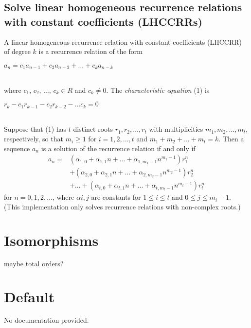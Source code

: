 \documentclass{article}
\begin{document}
\subsection{Solve linear homogeneous recurrence relations with constant coefficients (LHCCRRs)}
A linear homogeneous recurrence relation with constant coefficients (LHCCRR) of degree $k$ is a recurrence relation of the form\\
\centerline{$a_n = c_1a_{n-1} +c_2a_{n-2} + \dots +c_ka_{n-k}$}\\
where $c_1$, $c_2$, $\dots$, $c_k \in R$ and $c_k \neq 0$. The \emph{characteristic equation} (1) is\\
\centerline{$r_k - c_1r_{k-1} -c_2r_{k-2} - \dots c_k = 0$}\\
Suppose that (1) has $t$ distinct roots $r_1, r_2, \dots, r_t$ with multiplicities $m_1, m_2, \dots, m_t$, respectively, so that $m_i \ge 1$ for $i = 1, 2, \dots, t$ and $m_1 + m_2 + \dots + m_t = k$. Then a sequence $a_n$ is a solution of the recurrence relation if and only if
\begin{align*}
a_n =& (\alpha_{1,0} +\alpha_{1,1}n + \dots + \alpha_{1,m_1-1}n^{m_1-1})r_1^n\\
&+(\alpha_{2,0} +\alpha_{2,1}n + \dots + \alpha_{2,m_2-1}n^{m_2-1})r_2^n\\
&+\dots+ (\alpha_{t,0} +\alpha_{t,1}n + \dots + \alpha_{t,m_t-1}n^{m_t-1})r_t^n
\end{align*}
for $n = 0, 1, 2,\dots$, where $\alpha{i,j}$ are constants for $1 \le i \le t$ and $0 \le j \le m_i-1$.
(This implementation only solves recurrence relations with non-complex roots.)

\section{Isomorphisms}
maybe total orders?

\section{Default}
No documentation provided.
\end{document}
